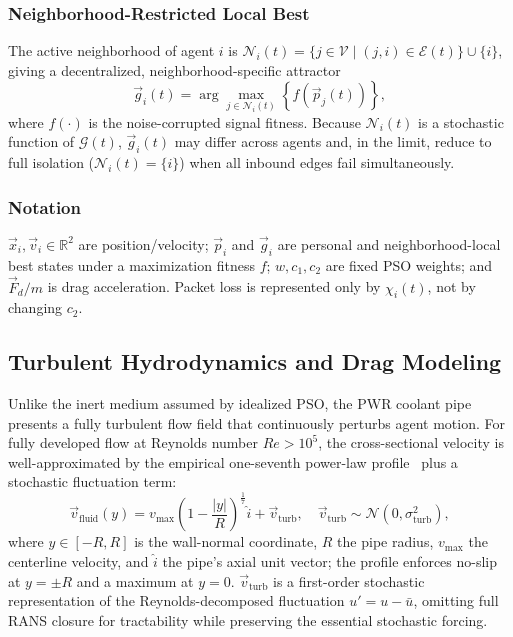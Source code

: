 \documentclass[conference]{IEEEtran}
\begin{document}
\subsubsection{Neighborhood-Restricted Local Best}
\label{sec:local-best}

The active neighborhood of agent $i$ is $\mathcal{N}_i(t) = \{j \in \mathcal{V} \mid (j,i)\in\mathcal{E}(t)\}\cup\{i\}$, giving a decentralized, neighborhood-specific attractor
\begin{equation}
\vec{g}_i(t) = \arg\max_{j \in \mathcal{N}_i(t)} \left\{ f\left(\vec{p}_j(t)\right) \right\},
\label{eq:local-gbest}
\end{equation}
where $f(\cdot)$ is the noise-corrupted signal fitness. Because $\mathcal{N}_i(t)$ is a stochastic function of $\mathcal{G}(t)$, $\vec{g}_i(t)$ may differ across agents and, in the limit, reduce to full isolation ($\mathcal{N}_i(t)=\{i\}$) when all inbound edges fail simultaneously.

\subsubsection{Notation}
\label{sec:param-defs}

$\vec{x}_i,\vec{v}_i\in\mathbb{R}^2$ are position/velocity; $\vec{p}_i$ and $\vec{g}_i$ are personal and neighborhood-local best states under a maximization fitness $f$; $w,c_1,c_2$ are fixed PSO weights; and $\vec F_d/m$ is drag acceleration. Packet loss is represented only by $\chi_i(t)$, not by changing $c_2$.

\subsection{Turbulent Hydrodynamics and Drag Modeling}
\label{sec:hydro}

Unlike the inert medium assumed by idealized PSO, the PWR coolant pipe presents a fully turbulent flow field that continuously perturbs agent motion. For fully developed flow at Reynolds number $Re>10^5$, the cross-sectional velocity is well-approximated by the empirical one-seventh power-law profile~\cite{turbulent_flow} plus a stochastic fluctuation term:
\begin{equation}
\vec{v}_{\text{fluid}}(y) = v_{\max}\left(1 - \frac{|y|}{R}\right)^{\frac{1}{7}}\hat{i} + \vec{v}_{\text{turb}}, \quad \vec{v}_{\text{turb}} \sim \mathcal{N}(0,\sigma_{\text{turb}}^2),
\label{eq:vfluid}
\end{equation}
where $y\in[-R,R]$ is the wall-normal coordinate, $R$ the pipe radius, $v_{\max}$ the centerline velocity, and $\hat{i}$ the pipe's axial unit vector; the profile enforces no-slip at $y=\pm R$ and a maximum at $y=0$. $\vec{v}_{\text{turb}}$ is a first-order stochastic representation of the Reynolds-decomposed fluctuation $u'=u-\bar{u}$, omitting full RANS closure for tractability while preserving the essential stochastic forcing.
\end{document}
